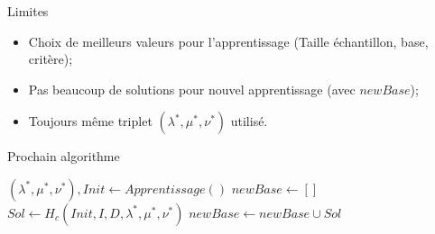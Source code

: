 \documentclass{beamer}
\begin{document}
\begin{frame}{Limites}
\begin{itemize}
\item Choix de meilleurs valeurs pour l'apprentissage (Taille échantillon, base, critère);
\item Pas beaucoup de solutions pour nouvel apprentissage (avec $newBase$);
\item Toujours même triplet $(\lambda^*,\mu^*,\nu^*)$ utilisé.
\end{itemize}
\end{frame}

\begin{frame}{Prochain algorithme}
\begin{algorithm}[H]
\DontPrintSemicolon %
$(\lambda^*,\mu^*,\nu^*), Init \gets Apprentissage()$\;
$newBase \gets []$\;
 {
	 {
		\textcolor{rouge} {
		 {
			$Sol \gets H_c(Init,I,D,\lambda^*,\mu^*,\nu^*)$\;
			$newBase \gets newBase \cup Sol$\;
			}	
		}
	}
}
\;
\end{algorithm}
\end{frame}
\end{document}
